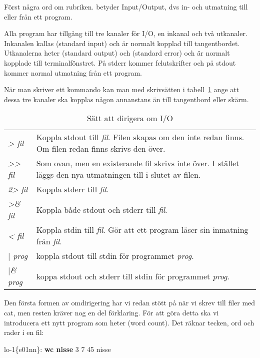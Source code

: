 \documentclass[a4paper,twocolumn]{book}
\begin{document}
Först några ord om rubriken.  betyder Input/Output, dvs in-
och utmatning till eller från ett program.

Alla program har tillgång till tre kanaler för I/O, en inkanal och två
utkanaler. Inkanalen kallas  (standard input) och är
normalt kopplad till tangentbordet. Utkanalerna heter 
(standard output) och  (standard error) och är normalt
kopplade till terminalfönstret. På stderr kommer felutskrifter och på
stdout kommer normal utmatning från ett program.

När man skriver ett kommando kan man med skrivsätten i
tabell~\ref{tab:io-redir} ange att dessa tre kanaler ska kopplas någon
annanstans än till tangentbord eller skärm.
\begin{table}[tbp]
  \hidettindex{<}\hidettindex{>}\hidettindex{>>}%
  \begin{tabularx}{\linewidth}{|lX|}\hline
    \emph{> fil}  & Koppla stdout till \emph{fil}. Filen skapas om den
    inte redan finns. Om filen redan finns skrivs den över.\\ 
    \emph{>{}> fil} & Som ovan, men en existerande fil skrivs inte
    över. I stället läggs den nya utmatningen till i slutet av filen. \\
    \emph{2> fil} & Koppla stderr till \emph{fil}. \\
    \emph{>\& fil} & Koppla både stdout och stderr till \emph{fil}. \\
    \emph{< fil} & Koppla stdin till \emph{fil}. Gör att ett program
    läser sin inmatning från \emph{fil}. \\
    \emph{$\mid$ prog} & koppla stdout till stdin för programmet
    \emph{prog}. \\
    \emph{$\mid$\& prog} & koppa stdout och stderr till stdin för programmet
    \emph{prog}. \\
    \hline
  \end{tabularx}
  \caption{Sätt att dirigera om I/O}
  \label{tab:io-redir}
\end{table}
Den första formen av omdirigering har vi redan stött på när vi skrev till
filer med cat, men resten kräver nog en del förklaring. För att göra
detta ska vi introducera ett nytt program som heter  (word
count). Det räknar tecken, ord och rader i en fil:
\begin{example}
lo-1\{e01nn\}: \textbf{wc nisse}
       3       7      45 nisse
\end{example}
\end{document}
